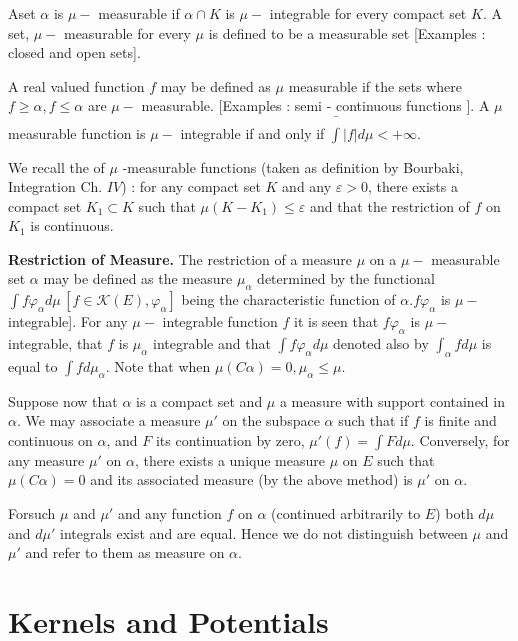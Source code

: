 A\pageoriginale set $\alpha$ is $\mu-$ measurable if $\alpha \cap K$ is $\mu-$
integrable for every compact set $K$. A set, $\mu-$ measurable for
every $\mu$ is defined to be a measurable set [Examples : closed and
  open sets]. 

A real valued function $f$ may be defined as $\mu$ measurable if the
sets where $f \ge \alpha, f \le \alpha$ are $\mu-$
measurable. [Examples : semi - continuous functions ]. A $\mu$
measurable function is $\mu-$ integrable if and only if $\bar{\int}
|f| d \mu < + \infty$. 

We recall the  of $\mu$ -measurable functions
(taken as definition by Bourbaki, Integration Ch. $IV$) : for any
compact set $K$ and any $\varepsilon > 0$, there exists a compact set
$K_1 \subset K$ such that $\mu (K -K_1) \le \varepsilon$ and that the
restriction of $f$ on $K_1$ is continuous. 

\noindent
\textbf{Restriction of Measure.} The restriction of a measure $\mu $
on a $\mu-$ measurable set $\alpha$ may be defined as the measure
$\mu_\alpha$ determined by the functional $\int f \varphi_{\alpha} d
\mu \,[f \in \mathcal{K} (E), \varphi_\alpha]$ being the
characteristic function of $\alpha. f \varphi_\alpha$ is $\mu-$
integrable]. For any $\mu- $ integrable function $f$ it is seen that
  $f \varphi_\alpha$ is $\mu-$ integrable, that $f$ is $\mu_\alpha$
  integrable and that $\int f \varphi_\alpha d \mu$ denoted also by
  $\int_\alpha f d \mu$ is equal to $\int f d \mu_\alpha$. Note that
  when $\mu (C \alpha) = 0, \mu_\alpha \le \mu$. 

Suppose now that $\alpha$ is a compact set and $\mu$ a measure with
support contained in $\alpha$. We may associate a measure $\mu'$ on
the subspace $\alpha$ such that if $f$ is finite and continuous on
$\alpha$, and $F$ its continuation by zero, $\mu' (f) = \int F d
\mu$. Conversely, for any measure $\mu'$ on $\alpha$, there exists a
unique measure $\mu$ on $E$ such that $\mu (C \alpha) = 0$ and its
associated measure (by the above method) is $\mu'$ on $\alpha$. 

\noindent
For\pageoriginale such $\mu$ and $\mu'$ and any function $f$ on $\alpha$ (continued
arbitrarily to $E$) both $d \mu$ and $d \mu'$ integrals exist and are
equal. Hence we do not distinguish between $\mu$ and $\mu'$ and refer
to them as measure on $\alpha$. 

\section{Kernels and Potentials}\label{p3:chap1:sec3}%

